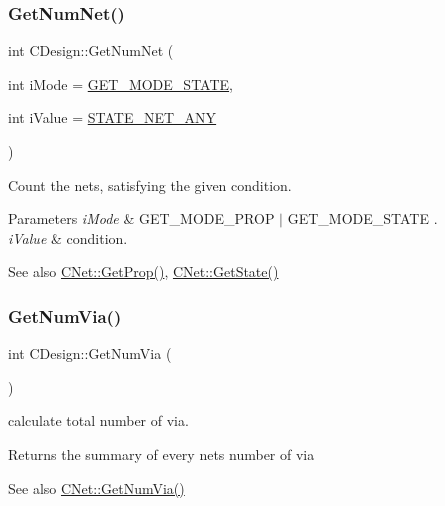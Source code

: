 \subsubsection{\texorpdfstring{GetNumNet()}{GetNumNet()}}
{\footnotesize\ttfamily int C\+Design\+::\+Get\+Num\+Net (\begin{DoxyParamCaption}\item[{int}]{i\+Mode = {\ttfamily \mbox{\hyperlink{BoxRouter_8h_a6f72f2cc9dd31793dd832ccfb2547de4}{G\+E\+T\+\_\+\+M\+O\+D\+E\+\_\+\+S\+T\+A\+TE}}},  }\item[{int}]{i\+Value = {\ttfamily \mbox{\hyperlink{BoxRouter_8h_a048013954c49608419bca2bcccad5b17}{S\+T\+A\+T\+E\+\_\+\+N\+E\+T\+\_\+\+A\+NY}}} }\end{DoxyParamCaption})}



Count the nets, satisfying the given condition. 


\begin{DoxyParams}{Parameters}
{\em i\+Mode} & G\+E\+T\+\_\+\+M\+O\+D\+E\+\_\+\+P\+R\+OP $\vert$ G\+E\+T\+\_\+\+M\+O\+D\+E\+\_\+\+S\+T\+A\+TE . \\
\hline
{\em i\+Value} & condition. \\
\hline
\end{DoxyParams}
\begin{DoxySeeAlso}{See also}
\mbox{\hyperlink{classCObject_afc32a8e7c4450a95c2a6333d7e3319b4}{C\+Net\+::\+Get\+Prop()}}, \mbox{\hyperlink{classCObject_a94f72fd4b4155dc18decb9d53f42dc99}{C\+Net\+::\+Get\+State()}} 
\end{DoxySeeAlso}
\mbox{\label{classCDesign_a28c4e077c911fbe9259d3ade4b91898d}} 
\subsubsection{\texorpdfstring{GetNumVia()}{GetNumVia()}}
{\footnotesize\ttfamily int C\+Design\+::\+Get\+Num\+Via (\begin{DoxyParamCaption}{ }\end{DoxyParamCaption})}



calculate total number of via. 

\begin{DoxyReturn}{Returns}
the summary of every nets\textquotesingle{} number of via 
\end{DoxyReturn}
\begin{DoxySeeAlso}{See also}
\mbox{\hyperlink{classCNet_abd9060bc972528e75eb26cabeceba261}{C\+Net\+::\+Get\+Num\+Via()}} 
\end{DoxySeeAlso}
\mbox{\label{classCDesign_a8a75e3e7df767d33c08f31076570ecb8}} 
